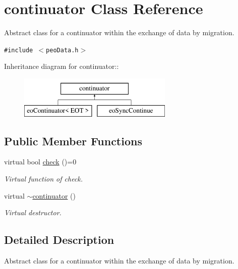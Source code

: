 \hypertarget{classcontinuator}{
\section{continuator Class Reference}
\label{classcontinuator}
}
Abstract class for a continuator within the exchange of data by migration.  


{\tt \#include $<$peo\-Data.h$>$}

Inheritance diagram for continuator::\begin{figure}[H]
\begin{center}
\leavevmode
\includegraphics[height=2cm]{classcontinuator}
\end{center}
\end{figure}
\subsection*{Public Member Functions}
\begin{CompactItemize}
\item 
virtual bool \hyperlink{classcontinuator_30601b037ab27b40610af1b979ec3d5b}{check} ()=0
\begin{CompactList}\small\item\em Virtual function of check. \item\end{CompactList}\item 
\hypertarget{classcontinuator_bb29ad98fb4a158a5582c24873bf3f30}{
virtual \hyperlink{classcontinuator_bb29ad98fb4a158a5582c24873bf3f30}{$\sim$continuator} ()}
\label{classcontinuator_bb29ad98fb4a158a5582c24873bf3f30}

\begin{CompactList}\small\item\em Virtual destructor. \item\end{CompactList}\end{CompactItemize}


\subsection{Detailed Description}
Abstract class for a continuator within the exchange of data by migration. 

